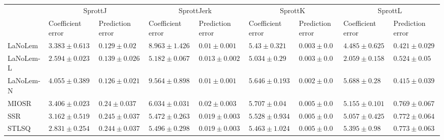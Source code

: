 \begin{table*}
{\begin{tabular}{lllllllll}
 & \multicolumn{2}{c}{SprottJ} & \multicolumn{2}{c}{SprottJerk} & \multicolumn{2}{c}{SprottK} & \multicolumn{2}{c}{SprottL} \\
 & Coefficient error & Prediction error & Coefficient error & Prediction error & Coefficient error & Prediction error & Coefficient error & Prediction error \\
\midrule
LaNoLem & $3.383\pm 0.613$ & $0.129\pm 0.02$ & $8.963\pm 1.426$ & $0.01\pm 0.001$ & $5.43\pm 0.321$ & $0.003\pm 0.0$ & $4.485\pm 0.625$ & $0.421\pm 0.029$ \\
LaNoLem-L & $\mathbf{2.594}\pm 0.023$ & $0.139\pm 0.026$ & $\mathbf{5.182}\pm 0.067$ & $0.013\pm 0.002$ & $\mathbf{5.034}\pm 0.29$ & $0.003\pm 0.0$ & $\mathbf{2.059}\pm 0.158$ & $0.524\pm 0.05$ \\
LaNoLem-N & $4.055\pm 0.389$ & $\mathbf{0.126}\pm 0.021$ & $9.564\pm 0.898$ & $\mathbf{0.01}\pm 0.001$ & $5.646\pm 0.193$ & $\mathbf{0.002}\pm 0.0$ & $5.688\pm 0.28$ & $\mathbf{0.415}\pm 0.039$ \\
MIOSR & $3.406\pm 0.023$ & $0.24\pm 0.037$ & $6.034\pm 0.031$ & $0.02\pm 0.003$ & $5.707\pm 0.04$ & $0.005\pm 0.0$ & $5.155\pm 0.101$ & $0.769\pm 0.067$ \\
SSR & $3.162\pm 0.519$ & $0.245\pm 0.037$ & $5.472\pm 0.263$ & $0.019\pm 0.003$ & $5.528\pm 0.934$ & $0.005\pm 0.0$ & $5.057\pm 0.425$ & $0.772\pm 0.064$ \\
STLSQ & $2.831\pm 0.254$ & $0.244\pm 0.037$ & $5.496\pm 0.298$ & $0.019\pm 0.003$ & $5.463\pm 1.024$ & $0.005\pm 0.0$ & $5.395\pm 0.98$ & $0.773\pm 0.063$ \\

\midrule


\end{tabular}}
\end{table*}
